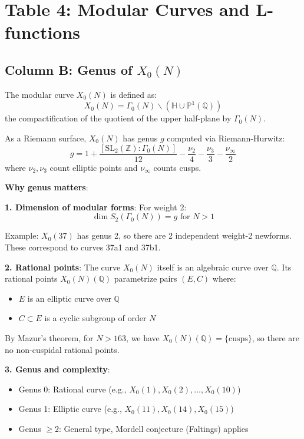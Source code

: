 \documentclass[11pt]{article}
\begin{document}
\section{Table 4: Modular Curves and L-functions}

\subsection{Column B: Genus of $X_0(N)$}

The modular curve $X_0(N)$ is defined as:
$$X_0(N) = \Gamma_0(N) \backslash (\mathbb{H} \cup \mathbb{P}^1(\mathbb{Q}))$$
the compactification of the quotient of the upper half-plane by $\Gamma_0(N)$.

As a Riemann surface, $X_0(N)$ has genus $g$ computed via Riemann-Hurwitz:
$$g = 1 + \frac{[\text{SL}_2(\mathbb{Z}):\Gamma_0(N)]}{12} - \frac{\nu_2}{4} - \frac{\nu_3}{3} - \frac{\nu_\infty}{2}$$
where $\nu_2, \nu_3$ count elliptic points and $\nu_\infty$ counts cusps.

\textbf{Why genus matters}:

\textbf{1. Dimension of modular forms}: For weight 2:
$$\dim S_2(\Gamma_0(N)) = g \text{ for } N > 1$$

Example: $X_0(37)$ has genus 2, so there are 2 independent weight-2 newforms. These correspond to curves 37a1 and 37b1.

\textbf{2. Rational points}: The curve $X_0(N)$ itself is an algebraic curve over $\mathbb{Q}$. Its rational points $X_0(N)(\mathbb{Q})$ parametrize pairs $(E, C)$ where:
\begin{itemize}
\item $E$ is an elliptic curve over $\mathbb{Q}$
\item $C \subset E$ is a cyclic subgroup of order $N$
\end{itemize}

By Mazur's theorem, for $N > 163$, we have $X_0(N)(\mathbb{Q}) = \{\text{cusps}\}$, so there are no non-cuspidal rational points.

\textbf{3. Genus and complexity}:
\begin{itemize}
\item Genus 0: Rational curve (e.g., $X_0(1), X_0(2), \ldots, X_0(10)$)
\item Genus 1: Elliptic curve (e.g., $X_0(11), X_0(14), X_0(15)$)
\item Genus $\geq 2$: General type, Mordell conjecture (Faltings) applies
\end{itemize}
\end{document}

